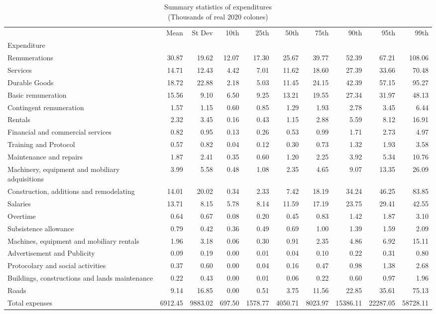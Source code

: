 \begin{table}[h]
\centering
\caption{Summary statistics of expenditures\\(Thousands of real 2020 colones)}
\begin{tabular}{lrrrrrrrrr}
\toprule
 & Mean & St Dev & 10th & 25th & 50th & 75th & 90th & 95th & 99th \\
Expenditure &  &  &  &  &  &  &  &  &  \\
\midrule
Remunerations & 30.87 & 19.62 & 12.07 & 17.30 & 25.67 & 39.77 & 52.39 & 67.21 & 108.06 \\
Services & 14.71 & 12.43 & 4.42 & 7.01 & 11.62 & 18.60 & 27.39 & 33.66 & 70.48 \\
Durable Goods & 18.72 & 22.88 & 2.18 & 5.03 & 11.45 & 24.15 & 42.39 & 57.15 & 95.27 \\
Basic remuneration & 15.56 & 9.10 & 6.50 & 9.25 & 13.21 & 19.55 & 27.34 & 31.97 & 48.13 \\
Contingent remuneration & 1.57 & 1.15 & 0.60 & 0.85 & 1.29 & 1.93 & 2.78 & 3.45 & 6.44 \\
Rentals & 2.32 & 3.45 & 0.16 & 0.43 & 1.15 & 2.88 & 5.59 & 8.12 & 16.91 \\
Financial and commercial services & 0.82 & 0.95 & 0.13 & 0.26 & 0.53 & 0.99 & 1.71 & 2.73 & 4.97 \\
Training and Protocol & 0.57 & 0.82 & 0.04 & 0.12 & 0.30 & 0.73 & 1.32 & 1.93 & 3.58 \\
Maintenance and repairs & 1.87 & 2.41 & 0.35 & 0.60 & 1.20 & 2.25 & 3.92 & 5.34 & 10.76 \\
Machinery, equipment and mobiliary adquisitions & 3.99 & 5.58 & 0.48 & 1.08 & 2.35 & 4.65 & 9.07 & 13.35 & 26.09 \\
Construction, additions and remodelating & 14.01 & 20.02 & 0.34 & 2.33 & 7.42 & 18.19 & 34.24 & 46.25 & 83.85 \\
Salaries & 13.71 & 8.15 & 5.78 & 8.14 & 11.59 & 17.19 & 23.75 & 29.41 & 42.55 \\
Overtime & 0.64 & 0.67 & 0.08 & 0.20 & 0.45 & 0.83 & 1.42 & 1.87 & 3.10 \\
Subsistence allowance & 0.79 & 0.42 & 0.36 & 0.49 & 0.69 & 1.00 & 1.39 & 1.59 & 2.09 \\
Machines, equipment and mobiliary rentals & 1.96 & 3.18 & 0.06 & 0.30 & 0.91 & 2.35 & 4.86 & 6.92 & 15.11 \\
Advertisement and Publicity & 0.09 & 0.19 & 0.00 & 0.01 & 0.04 & 0.10 & 0.22 & 0.31 & 0.80 \\
Protocolary and social activities & 0.37 & 0.60 & 0.00 & 0.04 & 0.16 & 0.47 & 0.98 & 1.38 & 2.68 \\
Buildings, constructions and lands maintenance & 0.22 & 0.43 & 0.00 & 0.01 & 0.06 & 0.22 & 0.60 & 0.97 & 1.96 \\
Roads & 9.14 & 16.85 & 0.00 & 0.51 & 3.75 & 11.56 & 22.85 & 35.61 & 75.13 \\
Total expenses & 6912.45 & 9883.02 & 697.50 & 1578.77 & 4050.71 & 8023.97 & 15386.11 & 22287.05 & 58728.11 \\
\bottomrule
\end{tabular}
\end{table}
